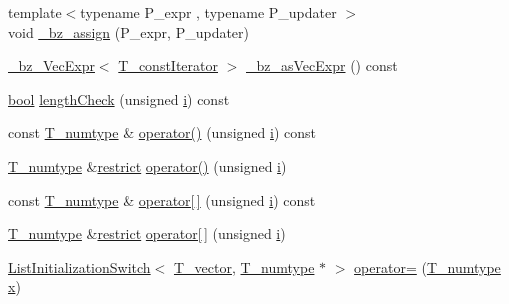 \begin{DoxyCompactItemize}
\item 
{\footnotesize template$<$typename P\+\_\+expr , typename P\+\_\+updater $>$ }\\void \hyperlink{classTinyVector_a91ab3b2a6678a69652dc19e116c4a59a}{\+\_\+bz\+\_\+assign} (P\+\_\+expr, P\+\_\+updater)
\item 
\hyperlink{class__bz__VecExpr}{\+\_\+bz\+\_\+\+Vec\+Expr}$<$ \hyperlink{classTinyVector_af420f8f49beb7efac60ac22a5d1f2e84}{T\+\_\+const\+Iterator} $>$ \hyperlink{classTinyVector_ae76d1dbf3163bd47a74c69c2f457d447}{\+\_\+bz\+\_\+as\+Vec\+Expr} () const 
\item 
\hyperlink{compiler_8h_abb452686968e48b67397da5f97445f5b}{bool} \hyperlink{classTinyVector_aafeb9ba1e759621c78b9d7b8babadeed}{length\+Check} (unsigned \hyperlink{indexexpr_8h_aabd77643995707c185e95c8cb2782c81}{i}) const 
\item 
const \hyperlink{classTinyVector_ab8e7df758dd5a369e92b3cb54a48bdbe}{T\+\_\+numtype} \& \hyperlink{classTinyVector_acc9fe7abc20a6b454bea94a75e817268}{operator()} (unsigned \hyperlink{indexexpr_8h_aabd77643995707c185e95c8cb2782c81}{i}) const 
\item 
\hyperlink{classTinyVector_ab8e7df758dd5a369e92b3cb54a48bdbe}{T\+\_\+numtype} \&\hyperlink{compiler_8h_a080abdcb9c02438f1cd2bb707af25af8}{restrict} \hyperlink{classTinyVector_a7be55be0cebe8a873660a693daeb67ce}{operator()} (unsigned \hyperlink{indexexpr_8h_aabd77643995707c185e95c8cb2782c81}{i})
\item 
const \hyperlink{classTinyVector_ab8e7df758dd5a369e92b3cb54a48bdbe}{T\+\_\+numtype} \& \hyperlink{classTinyVector_af35728f73013791f3726f80eb695cd35}{operator\mbox{[}$\,$\mbox{]}} (unsigned \hyperlink{indexexpr_8h_aabd77643995707c185e95c8cb2782c81}{i}) const 
\item 
\hyperlink{classTinyVector_ab8e7df758dd5a369e92b3cb54a48bdbe}{T\+\_\+numtype} \&\hyperlink{compiler_8h_a080abdcb9c02438f1cd2bb707af25af8}{restrict} \hyperlink{classTinyVector_af42df933d8dca5898274c89a24f5143b}{operator\mbox{[}$\,$\mbox{]}} (unsigned \hyperlink{indexexpr_8h_aabd77643995707c185e95c8cb2782c81}{i})
\item 
\hyperlink{classListInitializationSwitch}{List\+Initialization\+Switch}$<$ \hyperlink{classTinyVector_aea08e4463006acf6842a93c026b27094}{T\+\_\+vector}, \hyperlink{classTinyVector_ab8e7df758dd5a369e92b3cb54a48bdbe}{T\+\_\+numtype} $\ast$ $>$ \hyperlink{classTinyVector_a5aaae7f752e6da93a07c03e27cbbed72}{operator=} (\hyperlink{classTinyVector_ab8e7df758dd5a369e92b3cb54a48bdbe}{T\+\_\+numtype} \hyperlink{vecnorm1_8cc_ac73eed9e41ec09d58f112f06c2d6cb63}{x})

\end{DoxyCompactItemize}
